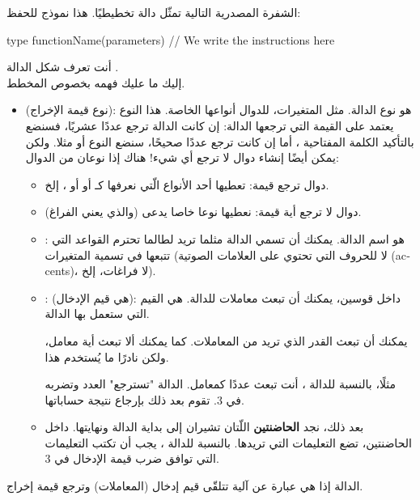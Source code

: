 الشفرة المصدرية التالية تمثّل دالة تخطيطيًا. هذا نموذج للحفظ:

\begin{Csource}
type functionName(parameters)
{
	// We write the instructions here
}
\end{Csource}

أنت تعرف شكل الدالة
.\\
إليك ما عليك فهمه بخصوص المخطط.

\begin{itemize}
	\item {}
	 (نوع قيمة الإخراج): 
	هو نوع الدالة. مثل المتغيرات، للدوال أنواعها الخاصة. هذا النوع يعتمد على القيمة التي ترجعها الدالة: إن كانت الدالة ترجع عددًا عشريًا، فسنضع بالتأكيد الكلمة المفتاحية 
	،
	أما إن كانت ترجع عددًا صحيحًا، سنضع النوع 
	أو 
	مثلا. ولكن يمكن أيضًا إنشاء دوال لا ترجع أي شيء!
	هناك إذا نوعان من الدوال:
	\begin{itemize}
		\item دوال ترجع قيمة: تعطيها أحد الأنواع الّتي نعرفها كـ
		أو 
		أو 
		،
		إلخ.
		\item دوال لا ترجع أية قيمة: نعطيها نوعا خاصا يدعى 
		(والذي يعني الفراغ).
		\item {}:
		هو اسم الدالة. يمكنك أن تسمي الدالة مثلما تريد لطالما تحترم القواعد التي تتبعها في تسمية المتغيرات (لا للحروف التي تحتوي على العلامات الصوتية
		(\textenglish{accents})،
		لا فراغات، إلخ).
		\item {}:
		(هي قيم الإدخال): داخل قوسين، يمكنك أن تبعث معاملات للدالة. هي القيم التي ستعمل بها الدالة.
		\begin{information}
			يمكنك أن تبعث القدر الذي تريد من المعاملات. كما يمكنك ألا تبعث أية معامل، ولكن نادرًا ما يُستخدم هذا.
		\end{information}
		
		مثلًا، بالنسبة للدالة 
		،
		أنت تبعث عددًا كمعامل. الدالة "تسترجع" العدد وتضربه في 3. تقوم بعد ذلك بإرجاع نتيجة حساباتها.
		\item بعد ذلك، نجد 
		\textbf{الحاضنتين}
		اللّتان تشيران إلى بداية الدالة ونهايتها. داخل الحاضنتين، تضع التعليمات التي تريدها. بالنسبة للدالة 
		،
		يجب أن تكتب التعليمات التي توافق ضرب قيمة الإدخال في 3.
	\end{itemize}
\end{itemize}
الدالة إذا هي عبارة عن آلية تتلقّى قيم إدخال (المعاملات) وترجع قيمة إخراج.


